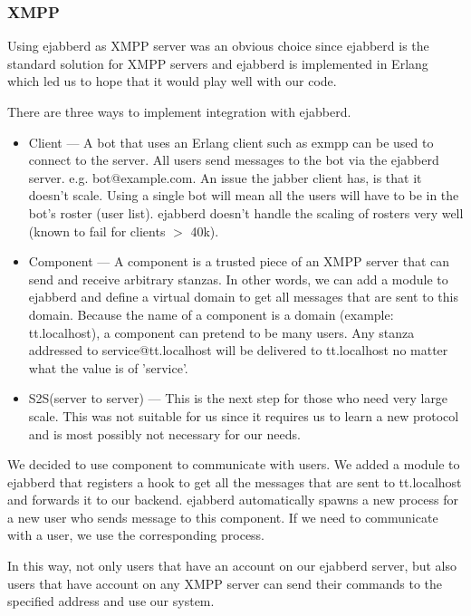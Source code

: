 \documentclass[11pt,a4paper]{report}
\begin{document}
\subsubsection{XMPP}
Using ejabberd as XMPP server was an obvious choice since ejabberd is the
standard solution for XMPP servers and ejabberd is implemented
in Erlang which led us to hope that it would play well with our code.

There are three ways to implement integration with ejabberd.

\begin{itemize}
\item Client --- A bot that uses an Erlang client such as exmpp can be used to
connect to the server.
All users send messages to the bot via the ejabberd server. e.g. bot@example.com.
An issue the jabber client has, is that it doesn’t scale. Using a single bot
will mean all the users will have to be in the bot’s roster (user list).
ejabberd doesn’t handle the scaling of rosters very well (known to fail for
clients $>$ 40k).
\item Component --- A component is a trusted piece of an XMPP server that can send
and receive arbitrary stanzas.
In other words, we can add a module to ejabberd and define a virtual domain to
get all messages that are sent to this domain.
Because the name of a component is a domain (example: tt.localhost), a component
can pretend to be many users.
Any stanza addressed to service@tt.localhost will be delivered to tt.localhost
no matter what the value is of 'service'.
\item S2S(server to server) --- This is the next step for those who need very
large scale. This was not suitable for us since it requires us to learn a new
protocol and is most possibly not necessary for our needs.
\end{itemize}

We decided to use component to communicate with users. We added a module to
ejabberd that registers a hook to get all the messages that are sent to
tt.localhost and forwards it to our backend. ejabberd automatically spawns a
new process for a new user who sends message to this component.
If we need to communicate with a user, we use the corresponding process.

In this way, not only users that have an account on our ejabberd server, but
also users that have account on any XMPP server can send their commands to the
specified address and use our system.
\end{document}
